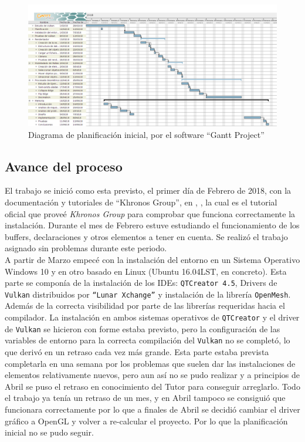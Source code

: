 \begin{figure} %
	\centering
	\hspace*{-1.6in}
	\includegraphics[scale=0.38]{imagenes/Modelator_GP_planning.png} 
	\caption{Diagrama de planificación inicial, por el software ``Gantt Project''} \label{fig:planificacion_inicial.png}
\end{figure}

\subsection{ Avance del proceso}
El trabajo se inició como esta previsto, el primer día de Febrero de 2018, con la documentación y tutoriales de ``Khronos Group'', en \cite{VulkanSubgroupTutorial2018}, \cite{IntroductionVulkanTutorial}, \cite{LunarXchange} la cual es el tutorial oficial que proveé \textit{Khronos Group} para comprobar que funciona correctamente la instalación. Durante el mes de Febrero estuve estudiando el funcionamiento de los buffers, declaraciones y otros elementos a tener en cuenta. Se realizó el trabajo asignado sin problemas durante este periodo.\\

A partir de Marzo empecé con la instalación del entorno en un Sistema Operativo Windows 10 y en otro basado en Linux (Ubuntu 16.04LST, en concreto). Esta parte se componía de la instalación de los IDEs: \texttt{QTCreator 4.5}, Drivers de \texttt{Vulkan} distribuidos por \texttt{``Lunar Xchange''} y instalación de la librería \texttt{OpenMesh}. Además de la correcta visibilidad por parte de las librerías requeridas hacia el compilador. La instalación en ambos sistemas operativos de \texttt{QTCreator} y el driver de \texttt{Vulkan} se hicieron con forme estaba previsto, pero la configuración de las variables de entorno para la correcta compilación del \texttt{Vulkan} no se completó, lo que derivó en un retraso cada vez más grande. Esta parte estaba prevista completarla en una semana por los problemas que suelen dar las instalaciones de elementos relativamente nuevos, pero aun así no se pudo realizar y a principios de Abril se puso el retraso en conocimiento del Tutor para conseguir arreglarlo. Todo el trabajo ya tenía un retraso de un mes, y en Abril tampoco se consiguió que funcionara correctamente por lo que a finales de Abril se decidió cambiar el driver gráfico a OpenGL y volver a re-calcular el proyecto. Por lo que la planificación inicial no se pudo seguir.


